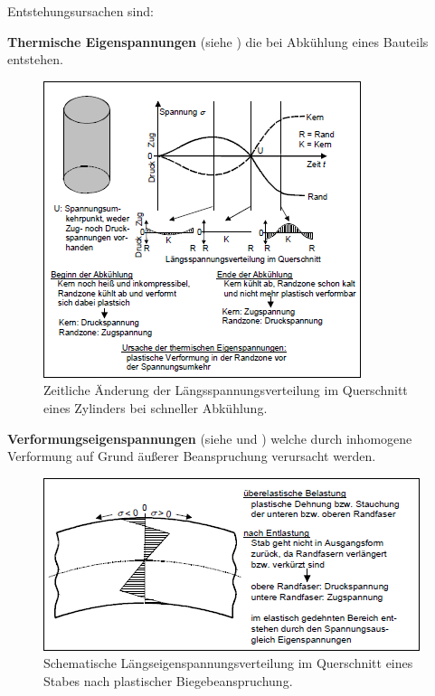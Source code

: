 \documentclass[12pt,a4paper,parskip,twoside,BCOR5mm,headsepline]{scrartcl}
\begin{document}
\begin{description*}
\begin{itemize*}
Entstehungsursachen sind:
\begin{itemize*}
\item \textbf{Thermische Eigenspannungen} (siehe ) die bei Abkühlung eines Bauteils entstehen.\begin{figure}
  \centering
  \includegraphics[width=.8\textwidth] {eigenspanabk}
  \caption[Spannungsverteilung eines Zylinders]{Zeitliche Änderung der Längsspannungsverteilung im Querschnitt eines Zylinders bei schneller Abkühlung. \autocite[34]{hu}}
  \label{fig:eigenspanabk}
  \end{figure}
  

\item \textbf{Verformungseigenspannungen} (siehe  und ) welche durch inhomogene Verformung auf Grund äußerer Beanspruchung verursacht werden.\begin{figure}
  \centering
  \includegraphics[width=.8\textwidth]{eigenspanfaser}
  \caption[Längseigenspannungsverteilung eines Stabquerschnittes]{Schematische Längseigenspannungsverteilung im Querschnitt eines Stabes nach plastischer Biegebeanspruchung.   \autocite[34]{hu}}
  \label{fig:eigenspanfaser}
  \end{figure}


\end{itemize*}
\end{itemize*}
\end{description*}
\end{document}
